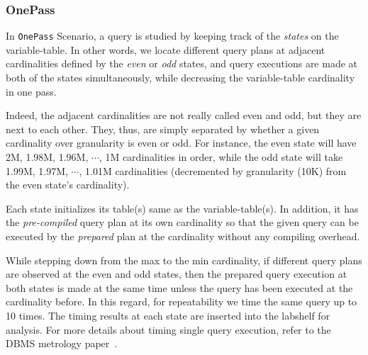 \documentclass[conference]{IEEEtran}
\begin{document}
\subsubsection{OnePass} 
In {\tt OnePass} Scenario, a query is studied by keeping track
of the {\em states} on the variable-table.
In other words, we locate different query plans at adjacent cardinalities
defined by the {\em even} or {\em odd} states,
and query executions are made at both of the states simultaneously,
while decreasing the variable-table cardinality in one pass.

Indeed, the adjacent cardinalities are not really called even and odd,
but they are next to each other.
They, thus, are simply separated by whether a given cardinality over
granularity is even or odd.
For instance, the even state will have 2M, 1.98M, 1.96M, $\cdots$, 1M cardinalities
in order, while the odd state will take 1.99M, 1.97M, $\cdots$, 1.01M cardinalities
(decremented by granularity (10K) from the even state's cardinality).

Each state initializes its table(s) same as the variable-table(s).
In addition, it has the {\em pre-compiled} query plan at its own cardinality
so that the given query can be executed by the {\em prepared} plan at the cardinality
without any compiling overhead.

While stepping down from the max to the min cardinality,
if different query plans are observed at the even and odd states,
then the prepared query execution at both states is made at the same time
unless the query has been executed at the cardinality before.
In this regard, for repeatability we time the same query up to 10 times.
The timing results at each state are inserted into the labshelf for
analysis.
For more details about timing single query execution, refer to the DBMS metrology paper~\cite{Currim}.
\end{document}
